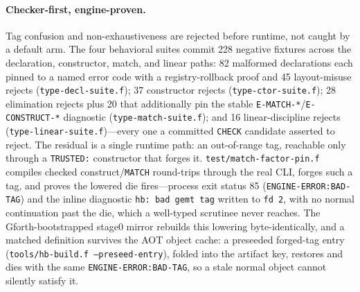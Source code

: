 \documentclass[11pt]{article}
\newcommand{\code}[1]{\texttt{#1}}
\begin{document}
\paragraph{Checker-first, engine-proven.} Tag confusion and non-exhaustiveness
are rejected before runtime, not caught by a default arm. The four behavioral
suites commit 228 negative fixtures across the declaration, constructor,
match, and linear paths: 82 malformed declarations each pinned to a named
error code with a registry-rollback proof and 45 layout-misuse rejects
(\code{type-decl-suite.f}); 37 constructor rejects (\code{type-ctor-suite.f});
28 elimination rejects plus 20 that additionally pin the stable
\code{E-MATCH-*}/\code{E-CONSTRUCT-*} diagnostic (\code{type-match-suite.f});
and 16 linear-discipline rejects (\code{type-linear-suite.f})---every one a
committed \code{CHECK} candidate asserted to reject. The residual is a single
runtime path: an out-of-range tag, reachable only through a \code{TRUSTED:}
constructor that forges it. \code{test/match-factor-pin.f} compiles checked
construct/\code{MATCH} round-trips through the real CLI, forges such a tag, and proves the lowered die
fires---process exit status 85 (\code{ENGINE-ERROR:BAD-TAG}) and the inline diagnostic
\code{hb: bad gemt tag} written to \code{fd~2}, with no normal continuation
past the die, which a well-typed scrutinee never reaches. The
Gforth-bootstrapped stage0 mirror rebuilds this lowering byte-identically, and
a matched definition survives the AOT object cache: a preseeded forged-tag
entry (\code{tools/hb-build.f --preseed-entry}), folded into the artifact key,
restores and dies with the same \code{ENGINE-ERROR:BAD-TAG}, so a stale normal object
cannot silently satisfy it.
\end{document}

